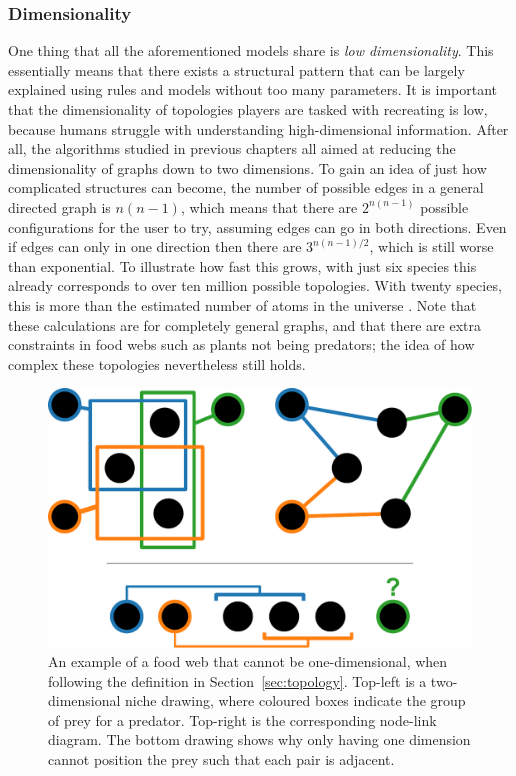 \subsubsection{Dimensionality}
One thing that all the aforementioned models share is \emph{low dimensionality}. This essentially means that there exists a structural pattern that can be largely explained using rules and models without too many parameters.
It is important that the dimensionality of topologies players are tasked with recreating is low, because humans struggle with understanding high-dimensional information. After all, the algorithms studied in previous chapters all aimed at reducing the dimensionality of graphs down to two dimensions. To gain an idea of just how complicated structures can become, the number of possible edges in a general directed graph is $n(n-1)$, which means that there are $2^{n(n-1)}$ possible configurations for the user to try, assuming edges can go in both directions. Even if edges can only in one direction then there are $3^{n(n-1)/2}$, which is still worse than exponential. To illustrate how fast this grows, with just six species this already corresponds to over ten million possible topologies. With twenty species, this is more than the estimated number of atoms in the universe \citep{Guth2003}.
Note that these calculations are for completely general graphs, and that there are extra constraints in food webs such as plants not being predators; the idea of how complex these topologies nevertheless still holds.

\begin{figure}
  \centering
  \includegraphics[width=.85\textwidth]{joy/niche.pdf}
  \caption[An illustration of food web dimensionality]{An example of a food web that cannot be one-dimensional, when following the definition in Section~\ref{sec:topology}. Top-left is a two-dimensional niche drawing, where coloured boxes indicate the group of prey for a predator. Top-right is the corresponding node-link diagram.
  The bottom drawing shows why only having one dimension cannot position the prey such that each pair is adjacent.}
  \label{fig:niche}
\end{figure}

